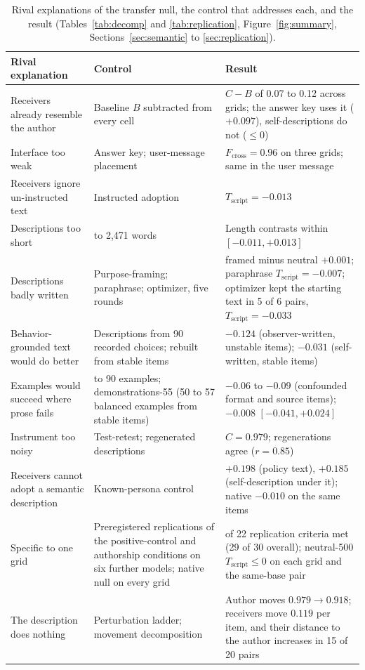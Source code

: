 \documentclass[11pt]{article}
\newcommand{\Fcross}{F_{\mathrm{cross}}}
\newcommand{\B}{B}
\newcommand{\Tscript}{T_{\mathrm{script}}}
\begin{document}
\begin{table}[!t]
\centering\footnotesize\setlength{\tabcolsep}{4pt}
\begin{tabular}{>{\raggedright\arraybackslash}p{4.2cm}>{\raggedright\arraybackslash}p{4.9cm}>{\raggedright\arraybackslash}p{6.2cm}}
\toprule
Rival explanation & Control & Result \\
\midrule
Receivers already resemble the author & Baseline $\B$ subtracted from every cell & $C - \B$ of 0.07 to 0.12 across grids; the answer key uses it ($+0.097$), self-descriptions do not ($\le 0$) \\
Interface too weak & Answer key; user-message placement & $\Fcross = 0.96$ on three grids; same in the user message \\
Receivers ignore un-instructed text & Instructed adoption & $\Tscript = -0.013$ \\
Descriptions too short & 84 to 2{,}471 words & Length contrasts within $[-0.011, +0.013]$ \\
Descriptions badly written & Purpose-framing; paraphrase; optimizer, five rounds & framed minus neutral $+0.001$; paraphrase $\Tscript = -0.007$; optimizer kept the starting text in 5 of 6 pairs, $\Tscript = -0.033$ \\
Behavior-grounded text would do better & Descriptions from 90 recorded choices; rebuilt from stable items & $-0.124$ (observer-written, unstable items); $-0.031$ (self-written, stable items) \\
Examples would succeed where prose fails & 30 to 90 examples; demonstrations-55 (50 to 57 balanced examples from stable items) & $-0.06$ to $-0.09$ (confounded format and source items); $-0.008$ $[-0.041, +0.024]$ \\
Instrument too noisy & Test-retest; regenerated descriptions & $C = 0.979$; regenerations agree ($r = 0.85$) \\
Receivers cannot adopt a semantic description & Known-persona control & $+0.198$ (policy text), $+0.185$ (self-description under it); native $-0.010$ on the same items \\
Specific to one grid & Preregistered replications of the positive-control and authorship conditions on six further models; native null on every grid & 21 of 22 replication criteria met (29 of 30 overall); neutral-500 $\Tscript \le 0$ on each grid and the same-base pair \\
The description does nothing & Perturbation ladder; movement decomposition & Author moves $0.979 \to 0.918$; receivers move $0.119$ per item, and their distance to the author increases in 15 of 20 pairs \\
\bottomrule
\end{tabular}
\caption{Rival explanations of the transfer null, the control that addresses each, and the result (Tables~\ref{tab:decomp} and \ref{tab:replication}, Figure~\ref{fig:summary}, Sections~\ref{sec:semantic} to \ref{sec:replication}).}
\label{tab:rivals}
\end{table}
\end{document}
